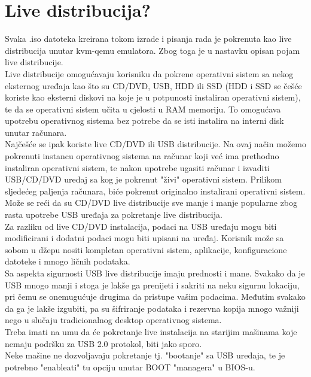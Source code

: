 \documentclass[12pt,vi]{mitthesis}
\begin{document}
\section*{Live distribucija?}
\indent
Svaka .iso datoteka kreirana tokom izrade i pisanja rada je pokrenuta kao live distribucija unutar kvm-qemu emulatora. Zbog toga je u nastavku opisan pojam live distribucije.\\
\indent
Live distribucije omogućavaju korisniku da pokrene operativni sistem sa nekog eksternog uređaja kao što su CD/DVD, USB, HDD ili SSD (HDD i SSD se češće koriste kao eksterni diskovi na koje je u potpunosti instaliran operativni sistem), te da se operativni sistem učita u cjelosti u RAM memoriju. To omogućava upotrebu operativnog sistema bez potrebe da se isti instalira na interni disk unutar računara.\\
\indent
Najčešće se ipak koriste live CD/DVD ili USB distribucije.
Na ovaj način možemo pokrenuti instancu operativnog sistema na računar koji već ima prethodno instaliran operativni sistem, te nakon upotrebe ugasiti računar i izvaditi USB/CD/DVD uređaj sa kog je pokrenut "živi" operativni sistem. Prilikom sljedećeg paljenja računara, biće pokrenut originalno instalirani operativni sistem.\\
Može se reći da su CD/DVD live distribucije sve manje i manje popularne zbog rasta upotrebe USB uređaja za pokretanje live distribucija.\\
\indent
Za razliku od live CD/DVD instalacija, podaci na USB uređaju mogu biti modificirani i dodatni podaci mogu biti upisani na uređaj. Korisnik može sa sobom u džepu nositi kompletan operativni sistem, aplikacije, konfiguracione datoteke i mnogo ličnih podataka.\\
\indent
Sa aspekta sigurnosti USB live distribucije imaju prednosti i mane. Svakako da je USB mnogo manji i stoga je lakše ga prenijeti i sakriti na neku sigurnu lokaciju, pri čemu se onemugućuje drugima da pristupe vašim podacima. Međutim svakako da ga je lakše izgubiti, pa su šifriranje podataka i rezervna kopija mnogo važniji nego u slučaju tradicionalnog desktop operativnog sistema.\\
\indent
Treba imati na umu da će pokretanje live instalacija na starijim mašinama koje nemaju podršku za USB 2.0 protokol, biti jako sporo.\\
Neke mašine ne dozvoljavaju pokretanje tj. "bootanje" sa USB uređaja, te je potrebno "enableati" tu opciju unutar BOOT "managera" u BIOS-u.
\end{document}

